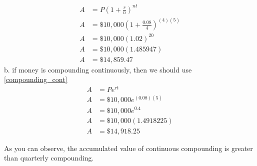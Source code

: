 		\begin{align*}
			A &= P\left(1+\frac{r}{n} \right)^{nt} \\
			A &= \$10,000\left(1+\frac{0.08}{4} \right)^{(4)(5)}\\
			A &= \$10,000\left(1.02 \right)^{20}\\
			A &= \$10,000\left(1.485947 \right)\\
			A &= \$14,859.47
		\end{align*}
b. if money is compounding continuously, then we should use \eqref{compounding_cont}
		\begin{align*}
			A &= Pe^{rt} \\
			A &= \$10,000e^{(0.08)(5)} \\
			A &= \$10,000e^{0.4} \\
			A &= \$10,000(1.4918225) \\
			A &= \$14,918.25
		\end{align*}

As you can observe, the accumulated value of continuous compounding is greater than quarterly
compounding.